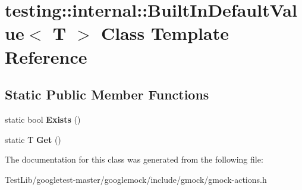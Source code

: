 \hypertarget{classtesting_1_1internal_1_1BuiltInDefaultValue}{}\section{testing\+:\+:internal\+:\+:Built\+In\+Default\+Value$<$ T $>$ Class Template Reference}
\label{classtesting_1_1internal_1_1BuiltInDefaultValue}
\subsection*{Static Public Member Functions}
\begin{DoxyCompactItemize}
\item 
\mbox{\label{classtesting_1_1internal_1_1BuiltInDefaultValue_a35207bc20a493b0efb3980eb9a08dd2f}} 
static bool {\bfseries Exists} ()
\item 
\mbox{\label{classtesting_1_1internal_1_1BuiltInDefaultValue_a7e26c1df14a887c8f393b29d6ea162e6}} 
static T {\bfseries Get} ()
\end{DoxyCompactItemize}


The documentation for this class was generated from the following file\+:\begin{DoxyCompactItemize}
\item 
Test\+Lib/googletest-\/master/googlemock/include/gmock/gmock-\/actions.\+h\end{DoxyCompactItemize}
